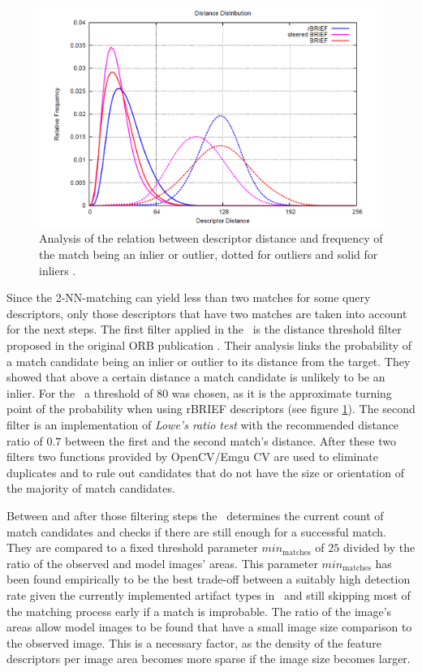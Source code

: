 \begin{figure}[h!]
	\centering
	\includegraphics[scale=0.3]{fig/distance_threshold_orb.png}
	\caption{Analysis of the relation between descriptor distance and frequency of the match being an inlier or outlier, dotted for outliers and solid for inliers \cite[p.~4]{orb}.}\label{fig:dist-thresh}
\end{figure}

Since the 2-NN-matching can yield less than two matches for some query descriptors, only those descriptors that have two matches are taken into account for the next steps. The first filter applied in the \vd~is the distance threshold filter proposed in the original ORB publication \cite{orb}. Their analysis links the probability of a match candidate being an inlier or outlier to its distance from the target. They showed that above a certain distance a match candidate is unlikely to be an inlier. For the \vd~a threshold of $80$ was chosen, as it is the approximate turning point of the probability when using rBRIEF descriptors (see figure \ref{fig:dist-thresh}). The second filter is an implementation of \emph{Lowe's ratio test} \cite{lowes_ratio} with the recommended distance ratio of $0.7$ between the first and the second match's distance. After these two filters two functions provided by OpenCV/Emgu CV are used to eliminate duplicates and to rule out candidates that do not have the size or orientation of the majority of match candidates.

Between and after those filtering steps the \vd~determines the current count of match candidates and checks if there are still enough for a successful match. They are compared to a fixed threshold parameter $min_{\text{matches}}$ of $25$ divided by the ratio of the observed and model images' areas. This parameter $min_{\text{matches}}$ has been found empirically to be the best trade-off between a suitably high detection rate given the currently implemented artifact types in \ape~and still skipping most of the matching process early if a match is improbable. The ratio of the image's areas allow model images to be found that have a small image size comparison to the observed image. This is a necessary factor, as the density of the feature descriptors per image area becomes more sparse if the image size becomes larger.

